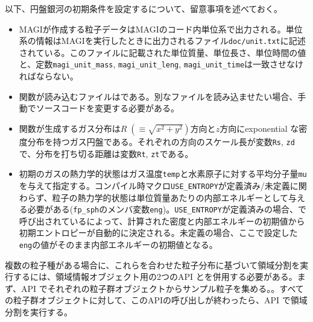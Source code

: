 以下、円盤銀河の初期条件を設定するについて、留意事項を述べておく。
\begin{itemize}
\item MAGIが作成する粒子データはMAGIのコード内単位系で出力される。単位系の情報はMAGIを実行したときに出力されるファイル\texttt{doc/unit.txt}に記述されている。このファイルに記載された単位質量、単位長さ、単位時間の値と、定数\texttt{magi\_unit\_mass}, \texttt{magi\_unit\_leng}, \texttt{magi\_unit\_time}は一致させなければならない。
\item 関数が読み込むファイルはである。別なファイルを読み込ませたい場合、手動でソースコードを変更する必要がある。
\item 関数が生成するガス分布は$R\; (\equiv \sqrt{x^{2}+y^{2}})$方向と$z$方向にexponential な密度分布を持つガス円盤である。それぞれの方向のスケール長が変数\texttt{Rs}, \texttt{zd}で、分布を打ち切る距離は変数\texttt{Rt}, \texttt{zt}である。
\item 初期のガスの熱力学的状態はガス温度\texttt{temp}と水素原子に対する平均分子量\texttt{mu}を与えて指定する。コンパイル時マクロ\texttt{USE\_ENTROPY}が定義済み/未定義に関わらず、粒子の熱力学的状態は単位質量あたりの内部エネルギーとして与える必要がある(\texttt{fp\_sph}のメンバ変数\texttt{eng})。\texttt{USE\_ENTROPY}が定義済みの場合、\mainFunc \mainFuncName で呼び出されているによって、計算された密度と内部エネルギーの初期値から初期エントロピーが自動的に決定される。未定義の場合、ここで設定した\texttt{eng}の値がそのまま内部エネルギーの初期値となる。
\end{itemize}

複数の粒子種がある場合に、これらを合わせた粒子分布に基づいて領域分割を実行するには、領域情報オブジェクト用の2つのAPI とを併用する必要がある。まず、API でそれぞれの粒子群オブジェクトからサンプル粒子を集める。\textbf{}。すべての粒子群オブジェクトに対して、このAPIの呼び出しが終わったら、API で領域分割を実行する。

